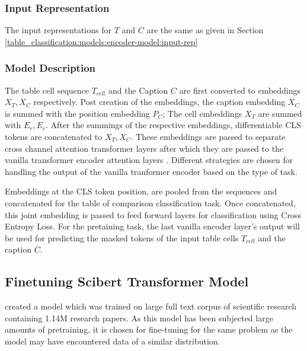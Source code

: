 \subsubsection{Input Representation}
The input representations for $T$ and $C$ are the same as given in Section \ref{table_classification:models:encoder-model:input-rep}


\subsubsection{Model Description}
The table cell sequence $T_{cell}$ and the Caption $C$ are first converted to embeddings $X_T, X_C$ respectively. Post creation of the embeddings,  the caption embedding  $X_C$ is summed with the position embedding $P_C$; The cell embeddings $X_T$ are summed with $E_r,E_c$. After the summings of the respective embeddings, differentiable CLS tokens are concatenated to $X_T,X_C$.
These embeddings are passed to separate cross channel attention transformer layers \parencite{tsai2019multimodal} after which they are passed to the vanilla transformer encoder attention layers \parencite{vaswani2017attention}. Different strategies are chosen for handling the output of the vanilla tranformer encoder based on the type of task. 

Embeddings at the CLS token position, are pooled from the sequences and concatenated for the table of comparison classification task. Once concatenated, this joint embedding is passed to feed forward layers for classification using Cross Entropy Loss. For the pretaining task, the last vanilla encoder layer’s output will be used for predicting the masked tokens of the input table cells $T_{cell}$ and the caption $C$.

\subsection{Finetuning Scibert Transformer Model}
\cite{beltagy2019scibert} created a model which was trained on large full text corpus of scientific research containing 1.14M research papers. As this model has been subjected large amounts of pretraining, it is chosen for fine-tuning for the same problem as the model may have encountered data of a similar distribution. 
